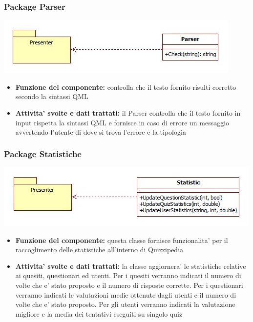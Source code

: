 			\subsubsection{Package Parser}
			\begin{center}
				\includegraphics[scale=0.6]{../images/Parser.jpg}
			\end{center}
 			\begin{itemize}
		    	\item\textbf{Funzione del componente:} controlla che il testo fornito risulti corretto secondo la sintassi QML
			\item\textbf{Attivita' svolte e dati trattati:} il Parser controlla che il testo fornito in input rispetta la sintassi QML e fornisce in caso di errore un messaggio avvertendo l'utente di dove si trova l'errore e la tipologia
			\end{itemize}
			
			\subsubsection{Package Statistiche}
			\begin{center}
				\includegraphics[scale=0.6]{../images/Statistics.jpg}
			\end{center}
 			\begin{itemize}
		    	\item\textbf{Funzione del componente:} questa classe fornisce funzionalita' per il raccoglimento delle statistiche all'interno di Quizzipedia
			\item\textbf{Attivita' svolte e dati trattati:} la classe aggiornera' le statistiche relative ai quesiti, questionari ed utenti.
			Per i quesiti verranno indicati il numero di volte che e' stato proposto e il numero di risposte corrette.
			Per i questionari verranno indicati le valutazioni medie ottenute dagli utenti e il numero di volte che e' stato proposto.
			Per gli utenti verranno indicati la valutazione migliore e la media dei tentativi eseguiti su singolo quiz
			\end{itemize}
			
